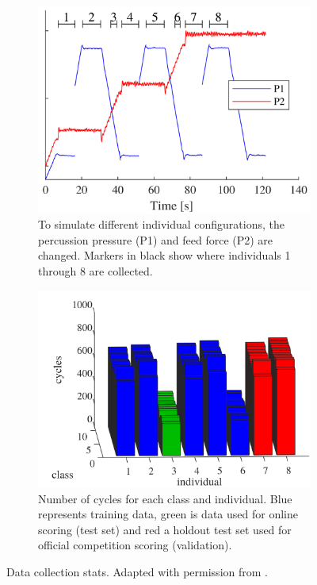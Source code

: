 \begin{figure}[!htb]
    \begin{center}
        \begin{subfigure}[t]{0.46\linewidth}
        \includegraphics[width=\linewidth]{figures/drill_5.png}
        \caption{To simulate different individual configurations, the percussion pressure (P1) and feed force (P2) are changed. Markers in black show where individuals 1 through 8 are collected.}
        \label{fig:phm_5}
    \end{subfigure}
    \hfill
    \begin{subfigure}[t]{0.51\linewidth}
        \includegraphics[width=\linewidth]{figures/drill_6.png}
        \caption{Number of cycles for each class and individual. Blue represents training data, green is data used for online scoring (test set) and red a holdout test set used for official competition scoring (validation).}
        \label{fig:phm_6}
    \end{subfigure}
    \caption{Data collection stats. Adapted with permission from \cite{jakobsson2022dataset}.}
    \label{fig:phm_5_6}
  \end{center}
  \end{figure}





